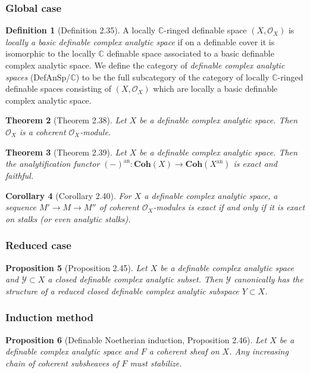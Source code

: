 \documentclass{amsart}
\newtheorem{theorem}{Theorem}[subsection]
\newtheorem{proposition}[theorem]{Proposition}
\newtheorem{corollary}[theorem]{Corollary}
\theoremstyle{definition}
\newtheorem{definition}[theorem]{Definition}
\numberwithin{equation}{section}
\newcommand{\analytic}{\mathrm{an}}
\begin{document}
\subsubsection{Global case}
\begin{definition}[Definition 2.35]
  A locally $\mathbb{C}$-ringed definable space $(X,\mathcal{O}_X)$ is \emph{locally a basic definable complex analytic space}
  if on a definable cover it is isomorphic to the locally $\mathbb{C}$ definable space
  associated to a basic definable complex analytic space.
  We define the category of \emph{definable complex analytic spaces} (DefAnSp/$\mathbb{C}$) to be
  the full subcategory of the category of locally $\mathbb{C}$-ringed definable spaces consisting of $(X,\mathcal{O}_X)$
  which are locally a basic definable complex analytic space.
\end{definition}

\begin{theorem}[Theorem 2.38]
  Let $X$ be a definable complex analytic space.
  Then $\mathcal{O}_X$ is a coherent $\mathcal{O}_X$-module.
\end{theorem}

\begin{theorem}[Theorem 2.39]
  Let $X$ be a definable complex analytic space.
  Then the analytification functor
  $(-)^{\analytic}: \mathbf{Coh}(X) \to \mathbf{Coh}(X^{\analytic})$ is exact and faithful.
\end{theorem}

\begin{corollary}[Corollary 2.40]
  For $X$ a definable complex analytic space,
  a sequence $M' \to M \to M''$ of coherent $\mathcal{O}_X$-modules
  is exact if and only if it is exact on stalks (or even analytic stalks).
\end{corollary}

\subsubsection{Reduced case}
\begin{proposition}[Proposition 2.45]
  Let $X$ be a definable complex analytic space and
  $\mathcal{Y} \subset X$ a closed definable complex analytic subset.
  Then $\mathcal{Y}$ canonically has the structure of a reduced closed definable complex analytic subspace $Y \subset X$.
\end{proposition}

\subsubsection{Induction method}
\begin{proposition}[Definable Noetherian induction, Proposition 2.46]
  Let $X$ be a definable complex analytic space and $F$ a coherent sheaf on $X$.
  Any increasing chain of coherent subsheaves of $F$ must stabilize.
\end{proposition}
\end{document}
